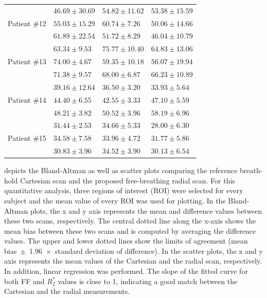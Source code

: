 \documentclass[journal,twoside,web]{ieeecolor}
\begin{document}
\begin{table}[h!]
\begin{tabular}{m{} m{} m{} m{}}
        \hline
        \multirow[t]{3}{*}{Patient \#12}
        & $46.69 \pm 30.69$ & $54.82 \pm 11.62$ & $53.38 \pm 15.59$ \\ %
        & $55.03 \pm 15.29$ & $60.74 \pm  7.26$ & $50.06 \pm 14.66$ \\
        & $61.89 \pm 22.54$ & $51.72 \pm  8.29$ & $46.04 \pm 10.79$ \\
        \hline
        \multirow[t]{3}{*}{Patient \#13}
        & $63.34 \pm 9.53$ & $75.77 \pm 10.40$ & $64.83 \pm 13.06$ \\ %
        & $74.00 \pm 4.67$ & $59.35 \pm 10.18$ & $56.07 \pm 19.94$ \\
        & $71.38 \pm 9.57$ & $68.00 \pm  6.87$ & $66.23 \pm 10.89$ \\
        \hline
        \multirow[t]{3}{*}{Patient \#14}
        & $39.16 \pm 12.64$ & $36.50 \pm 3.20$ & $33.93 \pm 5.64$ \\ %
        & $44.40 \pm  6.55$ & $42.55 \pm 3.33$ & $47.10 \pm 5.59$ \\
        & $48.21 \pm  3.82$ & $50.52 \pm 3.96$ & $58.19 \pm 6.96$ \\
        \hline
        \multirow[t]{3}{*}{Patient \#15}
        & $31.44 \pm 2.53$ & $34.66 \pm 5.33$ & $28.00 \pm 6.30$ \\ %
        & $34.58 \pm 7.58$ & $33.96 \pm 4.72$ & $31.77 \pm 5.86$ \\
        & $30.83 \pm 3.96$ & $34.52 \pm 3.90$ & $30.13 \pm 6.54$ \\
		\bottomrule
	\end{tabular}
\end{table}


 depicts the Bland-Altman as well as scatter plots 
comparing the reference breath-hold Cartesian scan and 
the proposed free-breathing radial scan. 
For this quantitative analysis, three regions of interest (ROI) 
were selected for every subject and the mean value of every ROI 
was used for plotting. 
In the Bland-Altman plots, the x and y axis represents 
the mean and difference values between these two scans, 
respectively.
The central dotted line along the x-axis shows the mean bias 
between these two scans and is computed by averaging the difference values.
The upper and lower dotted lines show the limits of agreement 
(mean bias~$\pm$~1.96~$\times$~standard deviation of difference). 
In the scatter plots, the x and y axis represents the mean values of 
the Cartesian and the radial scan, respectively. 
In addition, linear regression was performed. 
The slope of the fitted curve for both FF and $R_2^*$ values is close to 1, 
indicating a good match between the Cartesian and the radial measurements.
\end{document}
